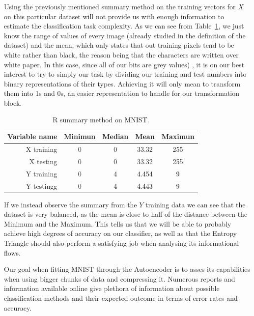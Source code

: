 Using the previously mentioned summary method on the training vectors for $X$ on this particular dataset will not provide us with enough information to estimate the classification task complexity. As we can see from Table~\ref{tab:table_MNIST}, we just know the range of values of every image (already studied in the definition of the dataset) and the mean, which only states that out training pixels tend to be white rather than black, the reason being that the characters are written over white paper. In this case, since all of our bits are grey values)
, it is on our best interest to try to simply our task by dividing our training and test numbers into binary representations of their types. Achieving it will only mean to transform them into 1s and 0s, an easier representation to handle for our transformation block. 
%
\begin{table}[H]
	\caption{R summary method on MNIST.}
	\begin{center}
		\label{tab:table_MNIST}
		\begin{tabular}{r|c|c|c|c} %
			\textbf{Variable name} & \textbf{Minimun} & \textbf{Median} & \textbf{Mean} & \textbf{Maximun}\\
			\hline
			X training & 0 & 0 & 33.32 & 255 \\
			X testing  & 0 & 0 & 33.32 & 255 \\
		    Y training & 0 & 4 & 4.454 & 9 \\
		    Y testingg & 0 & 4 & 4.443 & 9 \\
		\end{tabular}
	\end{center}
\end{table}


If we instead observe the summary from the $Y$ training data we can see that the dataset is very balanced, as the mean is close to half of the distance between the Minimum and the Maximum. This tells us that we will be able to probably achieve high degrees of accuracy on our classifier, as well as that the Entropy Triangle should also perform a satisfying job when analysing its informational flows.  \par

Our goal when fitting MNIST  through the Autoencoder is to asses its capabilities when using bigger chunks of data and compressing it. Numerous reports and information available online give plethora of information about possible classification methods and their expected outcome in terms of error rates and accuracy. 
%


